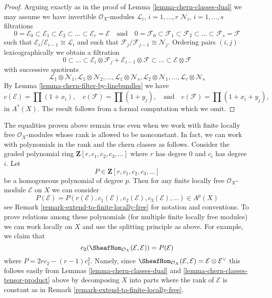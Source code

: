 \begin{proof}
Arguing exactly as in the proof of Lemma \ref{lemma-chern-classes-dual}
we may assume we have
invertible $\mathcal{O}_X$-modules
${\mathcal L}_i$, $i = 1, \ldots, r$
${\mathcal N}_i$, $i = 1, \ldots, s$
filtrations
$$
0 = \mathcal{E}_0 \subset \mathcal{E}_1 \subset \mathcal{E}_2
\subset \ldots \subset \mathcal{E}_r = \mathcal{E}
\quad\text{and}\quad
0 = \mathcal{F}_0 \subset \mathcal{F}_1 \subset \mathcal{F}_2
\subset \ldots \subset \mathcal{F}_s = \mathcal{F}
$$
such that $\mathcal{E}_i/\mathcal{E}_{i - 1} \cong \mathcal{L}_i$
and such that $\mathcal{F}_j/\mathcal{F}_{j - 1} \cong \mathcal{N}_j$.
Ordering pairs $(i, j)$ lexicographically
we obtain a filtration
$$
0 \subset \ldots \subset
\mathcal{E}_i \otimes \mathcal{F}_j
+
\mathcal{E}_{i - 1} \otimes \mathcal{F}
\subset \ldots \subset \mathcal{E} \otimes \mathcal{F}
$$
with successive quotients
$$
\mathcal{L}_1 \otimes \mathcal{N}_1,
\mathcal{L}_1 \otimes \mathcal{N}_2,
\ldots,
\mathcal{L}_1 \otimes \mathcal{N}_s,
\mathcal{L}_2 \otimes \mathcal{N}_1,
\ldots,
\mathcal{L}_r \otimes \mathcal{N}_s
$$
By Lemma \ref{lemma-chern-filter-by-linebundles}
we have
$$
c(\mathcal{E}) = \prod (1 + x_i),
\quad
c(\mathcal{F}) = \prod (1 + y_j),
\quad\text{and}\quad
c(\mathcal{F}) = \prod (1 + x_i + y_j),
$$
in $A^*(X)$. The result follows from a formal computation
which we omit.
\end{proof}

\begin{remark}
\label{remark-equalities-nonconstant-rank}
The equalities proven above remain true even when we work with
finite locally free
$\mathcal{O}_X$-modules whose rank is allowed to be nonconstant.
In fact, we can work with polynomials in the rank and the
chern classes as follows. Consider the  graded polynomial ring
$\mathbf{Z}[r, c_1, c_2, c_3, \ldots]$
where $r$ has degree $0$ and $c_i$ has degree $i$. Let
$$
P \in \mathbf{Z}[r, c_1, c_2, c_3, \ldots]
$$
be a homogeneous polynomial of degree $p$. Then for any finite locally
free $\mathcal{O}_X$-module $\mathcal{E}$ on $X$ we can consider
$$
P(\mathcal{E}) =
P(r(\mathcal{E}), c_1(\mathcal{E}), c_2(\mathcal{E}), c_3(\mathcal{E}), \ldots)
\in A^p(X)
$$
see Remark \ref{remark-extend-to-finite-locally-free} for notation and
conventions. To prove relations among these polynomials (for multiple
finite locally free modules) we can work locally on $X$ and use the splitting
principle as above. For example, we claim that
$$
c_2(\SheafHom_{\mathcal{O}_X}(\mathcal{E}, \mathcal{E})) =
P(\mathcal{E})
$$
where $P = 2rc_2 - (r - 1)c_1^2$.
Namely, since $\SheafHom_{\mathcal{O}_X}(\mathcal{E}, \mathcal{E}) =
\mathcal{E} \otimes \mathcal{E}^\vee$ this follows easily from
Lemmas \ref{lemma-chern-classes-dual} and
\ref{lemma-chern-classes-tensor-product}
above by decomposing $X$ into parts where the rank
of $\mathcal{E}$ is constant as in
Remark \ref{remark-extend-to-finite-locally-free}.
\end{remark}

